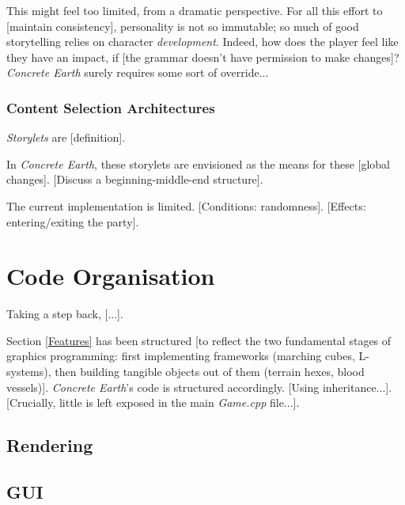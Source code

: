 \documentclass[a4paper, 11pt]{article}
\begin{document}
\begin{flushleft}
\vspace{5pt}\noindent
This might feel too limited, from a dramatic perspective. For all this effort to [maintain consistency], personality is not so immutable; so much of good storytelling relies on character \textit{development}.
Indeed, how does the player feel like they have an impact, if [the grammar doesn't have permission to make changes]? \textit{Concrete Earth} surely requires some sort of override...

\subsubsection{Content Selection Architectures} \textit{Storylets} \citep{kreminskiStorylets} are [definition].

\vspace{5pt}\noindent
In \textit{Concrete Earth}, these storylets are envisioned as the means for these [global changes]. [Discuss a beginning-middle-end structure].%
 
\vspace{5pt}\noindent
The current implementation is limited. [Conditions: randomness]. [Effects: entering/exiting the party].

\section{Code Organisation}

Taking a step back, [...].

\vspace{5pt}\noindent
Section \ref{Features} has been structured [to reflect the two fundamental stages of graphics programming: first implementing frameworks (marching cubes, L-systems), then building tangible objects out of them (terrain hexes, blood vessels)]. \textit{Concrete Earth}'s code is structured accordingly. [Using inheritance...]. [Crucially, little is left exposed in the main \textit{Game.cpp} file...].


\subsection{Rendering}

\subsection{GUI}


\end{flushleft}
\end{document}
